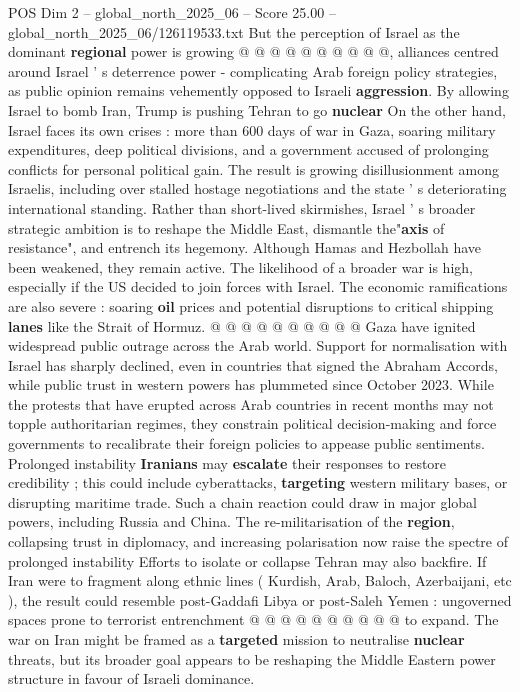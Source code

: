 \begin{textsample}{POS Dim 2 – global\_north\_2025\_06 – Score 25.00 – global\_north\_2025\_06/126119533.txt}
But the perception of Israel as the dominant \textbf{regional} power is growing @ @ @ @ @ @ @ @ @ @, alliances centred around Israel ' s deterrence power - complicating Arab foreign policy strategies, as public opinion remains vehemently opposed to Israeli \textbf{aggression}.
By allowing Israel to bomb Iran, Trump is pushing Tehran to go \textbf{nuclear} On the other hand, Israel faces its own crises : more than 600 days of war in Gaza, soaring military expenditures, deep political divisions, and a government accused of prolonging conflicts for personal political gain.
The result is growing disillusionment among Israelis, including over stalled hostage negotiations and the state ' s deteriorating international standing.
Rather than short-lived skirmishes, Israel ' s broader strategic ambition is to reshape the Middle East, dismantle the"\textbf{axis} of resistance", and entrench its hegemony.
Although Hamas and Hezbollah have been weakened, they remain active.
The likelihood of a broader war is high, especially if the US decided to join forces with Israel.
The economic ramifications are also severe : soaring \textbf{oil} prices and potential disruptions to critical shipping \textbf{lanes} like the Strait of Hormuz. @ @ @ @ @ @ @ @ @ @ Gaza have ignited widespread public outrage across the Arab world.
Support for normalisation with Israel has sharply declined, even in countries that signed the Abraham Accords, while public trust in western powers has plummeted since October 2023.
While the protests that have erupted across Arab countries in recent months may not topple authoritarian regimes, they constrain political decision-making and force governments to recalibrate their foreign policies to appease public sentiments.
Prolonged instability \textbf{Iranians} may \textbf{escalate} their responses to restore credibility ; this could include cyberattacks, \textbf{targeting} western military bases, or disrupting maritime trade.
Such a chain reaction could draw in major global powers, including Russia and China.
The re-militarisation of the \textbf{region}, collapsing trust in diplomacy, and increasing polarisation now raise the spectre of prolonged instability Efforts to isolate or collapse Tehran may also backfire.
If Iran were to fragment along ethnic lines ( Kurdish, Arab, Baloch, Azerbaijani, etc ), the result could resemble post-Gaddafi Libya or post-Saleh Yemen : ungoverned spaces prone to terrorist entrenchment @ @ @ @ @ @ @ @ @ @ to expand.
The war on Iran might be framed as a \textbf{targeted} mission to neutralise \textbf{nuclear} threats, but its broader goal appears to be reshaping the Middle Eastern power structure in favour of Israeli dominance.

\end{textsample}
